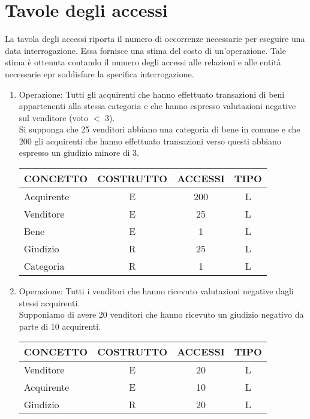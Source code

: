 \documentclass[a4paper, 10pt]{report}
\begin{document}
\section{Tavole degli accessi}
La tavola degli accessi riporta il numero di occorrenze necessarie per eseguire una data interrogazione. Essa fornisce una stima del costo di un'operazione. Tale stima \`e ottenuta contando il numero degli accessi alle relazioni e alle entit\`a necessarie epr soddisfare la specifica interrogazione.
\begin{enumerate}
\item Operazione: Tutti gli acquirenti che hanno effettuato transazioni di beni appartenenti alla stessa categoria e che hanno espresso valutazioni negative sul venditore (voto $<$ 3).\\
Si supponga che 25 venditori abbiano una categoria di bene in comune e che 200 gli acquirenti che hanno effettuato transazioni verso questi abbiano espresso un giudizio minore di 3.
\begin{table}[h!]
\centering
\begin{tabular}{|l|c|c|c|}
\hline
\textbf{CONCETTO}&\textbf{COSTRUTTO}&\textbf{ACCESSI}&\textbf{TIPO}\\
\hline
Acquirente & E & 200 & L\\
\hline
Venditore & E & 25 & L\\
\hline
Bene & E & 1 & L\\
\hline
Giudizio & R & 25 & L\\
\hline
Categoria & R & 1 & L\\
\hline
\end{tabular}
\end{table}

\item Operazione: Tutti i venditori che hanno ricevuto valutazioni negative dagli stessi acquirenti.\\
Supponiamo di avere 20 venditori che hanno ricevuto un giudizio negativo da parte di 10 acquirenti.
\begin{table}[h!]
\centering
\begin{tabular}{|l|c|c|c|}
\hline
\textbf{CONCETTO}&\textbf{COSTRUTTO}&\textbf{ACCESSI}&\textbf{TIPO}\\
\hline
Venditore & E & 20 & L\\
\hline
Acquirente & E & 10 & L\\
\hline
Giudizio & R & 20 & L\\
\hline
\end{tabular}
\end{table}


\end{enumerate}
\end{document}
